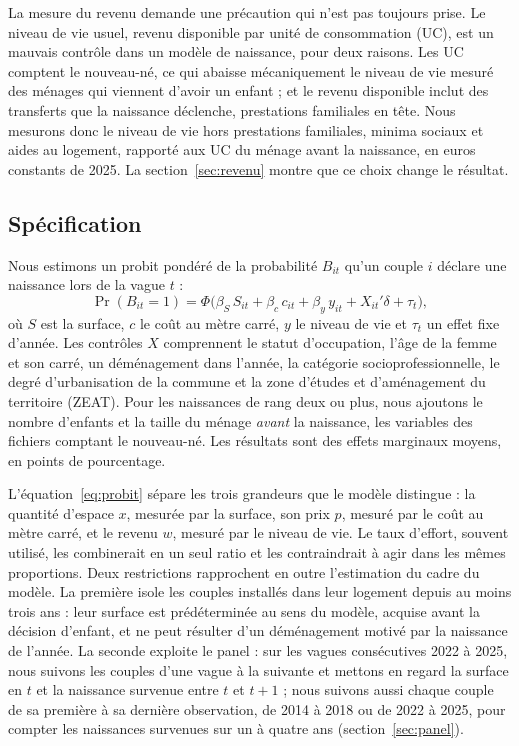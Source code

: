 \documentclass[11pt,a4paper]{article}
\theoremstyle{plain}
\theoremstyle{definition}
\theoremstyle{remark}
\begin{document}
La mesure du revenu demande une précaution qui n'est pas toujours prise. Le niveau de vie usuel, revenu disponible par unité de consommation (UC), est un mauvais contrôle dans un modèle de naissance, pour deux raisons. Les UC comptent le nouveau-né, ce qui abaisse mécaniquement le niveau de vie mesuré des ménages qui viennent d'avoir un enfant ; et le revenu disponible inclut des transferts que la naissance déclenche, prestations familiales en tête. Nous mesurons donc le niveau de vie hors prestations familiales, minima sociaux et aides au logement, rapporté aux UC du ménage avant la naissance, en euros constants de 2025. La section~\ref{sec:revenu} montre que ce choix change le résultat.

\subsection{Spécification}

Nous estimons un probit pondéré de la probabilité $B_{it}$ qu'un couple $i$ déclare une naissance lors de la vague $t$ :
\begin{equation}\label{eq:probit}
\Pr(B_{it} = 1) = \Phi\big(\beta_S\, S_{it} + \beta_c\, c_{it} + \beta_y\, y_{it} + X_{it}'\delta + \tau_t\big),
\end{equation}
où $S$ est la surface, $c$ le coût au mètre carré, $y$ le niveau de vie et $\tau_t$ un effet fixe d'année. Les contrôles $X$ comprennent le statut d'occupation, l'âge de la femme et son carré, un déménagement dans l'année, la catégorie socioprofessionnelle, le degré d'urbanisation de la commune et la zone d'études et d'aménagement du territoire (ZEAT). Pour les naissances de rang deux ou plus, nous ajoutons le nombre d'enfants et la taille du ménage \emph{avant} la naissance, les variables des fichiers comptant le nouveau-né. Les résultats sont des effets marginaux moyens, en points de pourcentage.

L'équation~\eqref{eq:probit} sépare les trois grandeurs que le modèle distingue : la quantité d'espace $x$, mesurée par la surface, son prix $p$, mesuré par le coût au mètre carré, et le revenu $w$, mesuré par le niveau de vie. Le taux d'effort, souvent utilisé, les combinerait en un seul ratio et les contraindrait à agir dans les mêmes proportions. Deux restrictions rapprochent en outre l'estimation du cadre du modèle. La première isole les couples installés dans leur logement depuis au moins trois ans : leur surface est prédéterminée au sens du modèle, acquise avant la décision d'enfant, et ne peut résulter d'un déménagement motivé par la naissance de l'année. La seconde exploite le panel : sur les vagues consécutives 2022 à 2025, nous suivons les couples d'une vague à la suivante et mettons en regard la surface en $t$ et la naissance survenue entre $t$ et $t+1$ ; nous suivons aussi chaque couple de sa première à sa dernière observation, de 2014 à 2018 ou de 2022 à 2025, pour compter les naissances survenues sur un à quatre ans (section~\ref{sec:panel}).
\end{document}
